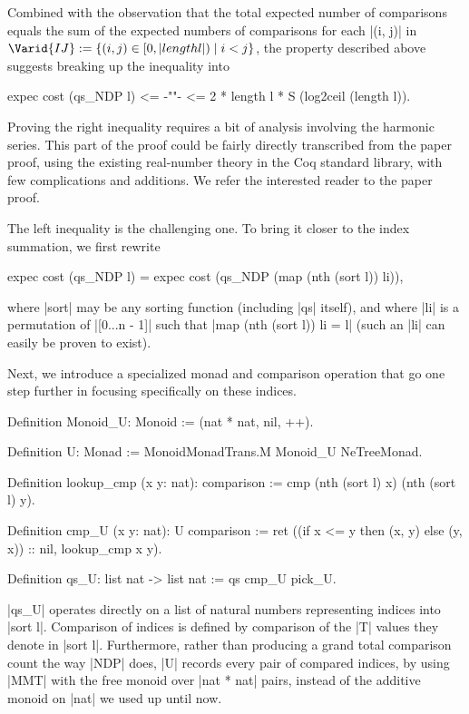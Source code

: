 \documentclass[runningheads]{llncs}
\begin{document}
Combined with the observation that the total expected number of comparisons equals the sum of the expected numbers of comparisons for each |(i, j)| in $\Varid{IJ} := \{ (i, j) \in [0, |length l|) \mid i < j \}$, the property described above suggests breaking up the inequality into
\begin{code}
  expec cost (qs_NDP l) <= {-""-} <= 2 * length l * S (log2ceil (length l)).
\end{code}
Proving the right inequality requires a bit of analysis involving the harmonic series. This part of the proof could be fairly directly transcribed from the paper proof, using the existing real-number theory in the Coq standard library, with few complications and additions. We refer the interested reader to the paper proof.

The left inequality is the challenging one. To bring it closer to the index summation, we first rewrite
\begin{code}
  expec cost (qs_NDP l) = expec cost (qs_NDP (map (nth (sort l)) li)),
\end{code}
where |sort| may be any sorting function (including |qs| itself), and where |li| is a permutation of |[0...n - 1]| such that |map (nth (sort l)) li = l| (such an |li| can easily be proven to exist).

Next, we introduce a specialized monad and comparison operation that go one step further in focusing specifically on these indices.
\begin{code}
  Definition Monoid_U: Monoid := (nat * nat, nil, ++).

  Definition U: Monad := MonoidMonadTrans.M Monoid_U NeTreeMonad.

  Definition lookup_cmp (x y: nat): comparison :=
    cmp (nth (sort l) x) (nth (sort l) y).

  Definition cmp_U (x y: nat): U comparison :=
    ret ((if x <= y then (x, y) else (y, x)) :: nil, lookup_cmp x y).

  Definition qs_U: list nat -> list nat := qs cmp_U pick_U.
\end{code}
|qs_U| operates directly on a list of natural numbers representing indices into |sort l|. Comparison of indices is defined by comparison of the |T| values they denote in |sort l|. Furthermore, rather than producing a grand total comparison count the way |NDP| does, |U| records every pair of compared indices, by using |MMT| with the free monoid over |nat * nat| pairs, instead of the additive monoid on |nat| we used up until now.
\end{document}
